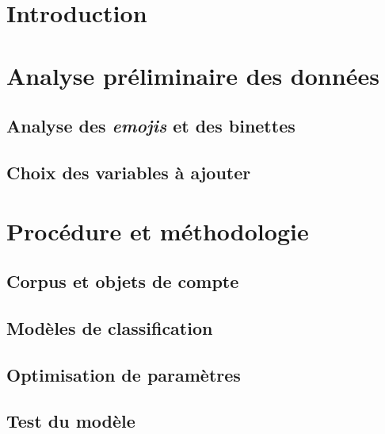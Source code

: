 \documentclass{article}
\numberwithin{equation}{section}
\begin{document}

\newpage
\tableofcontents
\newpage

\section{Introduction}



\section{Analyse préliminaire des données} \label{sec:analyse_prelim}
\subsection{Analyse des \emph{emojis} et des binettes} \label{subsec:emojis}


\subsection{Choix des variables à ajouter} \label{subsec:variables}



\section{Procédure et méthodologie} \label{sec:methodologie}


\subsection{Corpus et objets de compte} \label{subsec:corpus}


\subsection{Modèles de classification} \label{subsec:modeles}


\subsection{Optimisation de paramètres} \label{subsec:optimisation}


\subsection{Test du modèle} \label{subsec:test}

\end{document}

